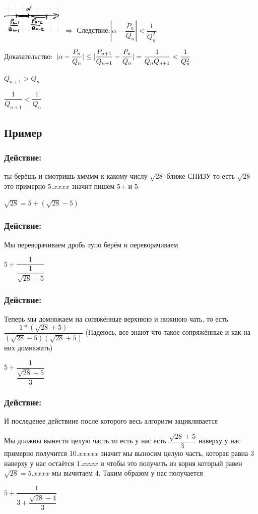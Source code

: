 \documentclass[12pt]{article}
\begin{document}
\includegraphics[width=30mm]{image1.png}
$\Rightarrow$ Следствие:$ |\alpha - \dfrac{P_{n}}{Q_{n}}| < \dfrac{1}{Q^2_n}$

Доказательство: $|\alpha - \dfrac{P_{n}}{Q_{n}}| \leq |\dfrac{P_{n+1}}{Q_{n+1}} - \dfrac{P_{n}}{Q_{n}}| = \dfrac{1}{Q_n Q_{n+1}} < \dfrac{1}{Q^2_n}  \vspace{2 ex}$

$Q_{n+1} > Q_n$

$\dfrac{1}{Q_{n+1}} < \dfrac{1}{Q_n} $

\subsection{Пример}
\subsubsection{Действие:}  ты берёшь и смотришь хмммм к какому числу $\sqrt{28}$ ближе СНИЗУ то есть $\sqrt{28}$ это примерно $5.xxxx$ значит пишем 5+ и 5- \par
$\sqrt{28} = 5 + (\sqrt{28} - 5)$\par
\subsubsection{Действие:} Мы переворачиваем дробь тупо берём и переворачиваем\par
$5 + \dfrac{1}{\dfrac{1}{\sqrt{28} - 5}}$
\subsubsection{Действие:}
Теперь мы домножаем на сопяжённые верхнюю и нижнюю чать, то есть $\dfrac{1 * (\sqrt{28} + 5)}{(\sqrt{28} - 5)(\sqrt{28} + 5)}$
(Надеюсь, все знают что такое сопряжённые и как на них домнажать)\par
$5 + \dfrac{1}{\dfrac{\sqrt{28}+5}{3}}$

\subsubsection{Действие:}
И последенее действиие после которого весь алгоритм зацикливается\par
Мы должны вынести целую часть то есть у нас есть $\dfrac{\sqrt{28}+5}{3}$ наверху у нас примерно получится $10.xxxxx$ значит мы выносим целую часть, которая равна 3 наверху у нас остаётся $1.xxxx$ и чтобы это получить из корня который равен $\sqrt{28} = 5.xxxx$ мы вычитаем $4$. Таким образом у нас получается\par
$5 + \dfrac{1}{3 + \dfrac{\sqrt{28} - 4}{3}}$
\end{document}
